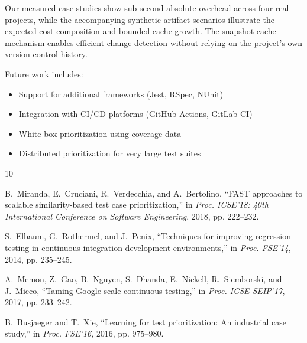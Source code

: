 \documentclass[10pt,conference]{IEEEtran}
\begin{document}
Our measured case studies show sub-second absolute overhead across four real projects, while the accompanying synthetic artifact scenarios illustrate the expected cost composition and bounded cache growth. The snapshot cache mechanism enables efficient change detection without relying on the project's own version-control history.

Future work includes:
\begin{itemize}
    \item Support for additional frameworks (Jest, RSpec, NUnit)
    \item Integration with CI/CD platforms (GitHub Actions, GitLab CI)
    \item White-box prioritization using coverage data
    \item Distributed prioritization for very large test suites
\end{itemize}

\balance


\begin{thebibliography}{10}

B.~Miranda, E.~Cruciani, R.~Verdecchia, and A.~Bertolino, ``{FAST} approaches to scalable similarity-based test case prioritization,'' in \emph{Proc. ICSE'18: 40th International Conference on Software Engineering}, 2018, pp. 222--232.

S.~Elbaum, G.~Rothermel, and J.~Penix, ``Techniques for improving regression testing in continuous integration development environments,'' in \emph{Proc. FSE'14}, 2014, pp. 235--245.

A.~Memon, Z.~Gao, B.~Nguyen, S.~Dhanda, E.~Nickell, R.~Siemborski, and J.~Micco, ``Taming Google-scale continuous testing,'' in \emph{Proc. ICSE-SEIP'17}, 2017, pp. 233--242.

B.~Busjaeger and T.~Xie, ``Learning for test prioritization: An industrial case study,'' in \emph{Proc. FSE'16}, 2016, pp. 975--980.

\end{thebibliography}
\end{document}
